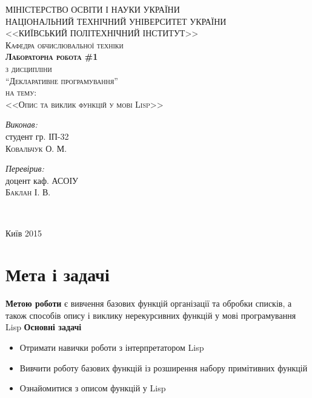 \documentclass[a4paper, 12pt]{extarticle}
\begin{document}
\begin{titlepage}
  \thispagestyle{empty}
  \center
  \textsc{\uppercase{Міністерство освіти і науки України\\Національний технічний університет України\\<<Київський політехнічний інститут>>}}\\[1cm]
  \textsc{Кафедра обчислювальної техніки}\\[0.5cm]
  \vfill
  \textsc{\Large \textbf{Лабораторна робота \#1}}\\
  \textsc{з дисципліни}\\
  \textsc{\large ``Декларативне програмування''}\\
  \textsc{на тему:}\\
  \textsc{\Large <<Опис та виклик функцій у мові Lisp>>}\\
  \vspace{3cm}
  \begin{minipage}{0.4\textwidth}
    \begin{flushleft} \large
      \emph{Виконав:}\\
      студент гр. ІП-32 \\
      \textsc{Ковальчук О. М.} %
    \end{flushleft}
  \end{minipage}
  \begin{minipage}{0.4\textwidth}
    \begin{flushright} \large
      \emph{Перевірив:} \\
      доцент каф. АСОІУ \\
      \textsc{Баклан І. В.} %
    \end{flushright}
  \end{minipage}\\[4cm]
  \vfill

  Київ 2015
\end{titlepage}
\setcounter{page}{2}
\section{Мета і задачі}
\textbf{Метою роботи} є вивчення базових функцій організації та обробки списків, а також способів опису і виклику нерекурсивних функцій у мові програмування Lisp
\textbf{Основні задачі}
\begin{itemize}
  \item Отримати навички роботи з інтерпретатором Lisp
  \item Вивчити роботу базових функцій із розширення набору примітивних функцій
  \item Ознайомитися з описом функцій у Lisp
\end{itemize}
\end{document}
